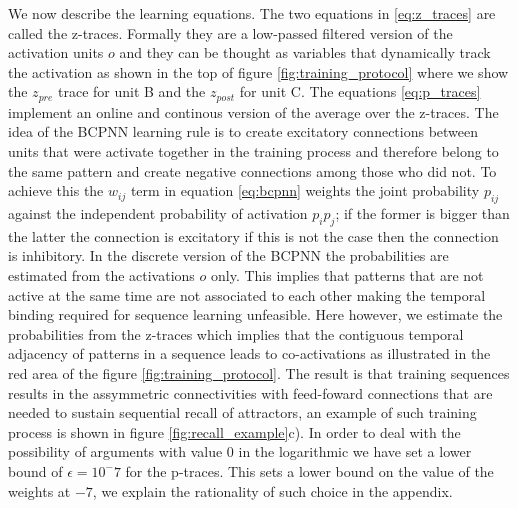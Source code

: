 \documentclass[10pt,a4paper]{article}
\begin{document}
We now describe the learning equations. The two equations in \ref{eq:z_traces} are called the z-traces. Formally they are a low-passed filtered version of the activation units $o$ and they can be thought as variables that dynamically track the activation as shown in the top of figure \ref{fig:training_protocol} where we show the $z_{pre}$ trace for unit B and the $z_{post}$ for unit C. The equations \ref{eq:p_traces} implement an online and continous version of the average over the z-traces.  The idea of the BCPNN learning rule is to create excitatory connections between units that were activate together in the training process and therefore belong to the same pattern and create negative connections among those who did not. To achieve this the $w_{ij}$ term in equation \ref{eq:bcpnn} weights the joint probability $p_{ij}$ against the independent probability of activation $p_i p_j$; if the former is bigger than the latter the connection is excitatory if this is not the case then the connection is inhibitory. In the discrete version of the BCPNN the probabilities are estimated from the activations $o$ only. This implies that patterns that are not active at the same time are not associated to each other making the temporal binding required for sequence learning unfeasible. Here however, we estimate the probabilities from the z-traces which implies that the contiguous temporal adjacency of patterns in a sequence leads to co-activations as illustrated in the red area of the figure \ref{fig:training_protocol}. The result is that training sequences results in the assymmetric connectivities with feed-foward connections that are needed to sustain sequential recall of attractors, an example of such training process is shown in figure \ref{fig:recall_example}c).  In order to deal with the possibility of arguments with value 0 in the logarithmic we have set a lower bound of $\epsilon = 10^-7$ for the p-traces. This sets a lower bound on the value of the weights at $-7$, we explain the rationality of such choice in the appendix. 

 
\end{document}

